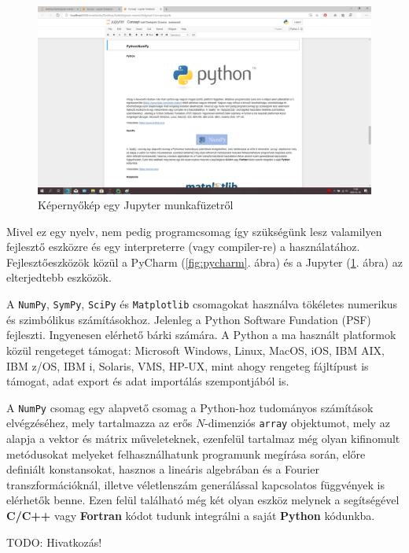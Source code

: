 \begin{figure}
\centering
\includegraphics[width=\textwidth]{img/Jupyter_screenshot.png}
\caption{Képernyőkép egy Jupyter munkafüzetről}
\label{fig:jupyter}
\end{figure}

Mivel ez egy nyelv, nem pedig programcsomag így
szükségünk lesz valamilyen fejlesztő eszközre és egy interpreterre (vagy
compiler-re) a használatához.
Fejlesztőeszközök közül a PyCharm (\ref{fig:pycharm}. ábra) és a Jupyter (\ref{fig:jupyter}. ábra) az elterjedtebb eszközök.

A \texttt{NumPy}, \texttt{SymPy},
\texttt{SciPy} és \texttt{Matplotlib} csomagokat használva tökéletes
numerikus és szimbólikus számításokhoz. Jelenleg a Python Software
Fundation (PSF) fejleszti. Ingyenesen elérhető bárki számára. A Python a
ma használt platformok közül rengeteget támogat: Microsoft Windows,
Linux, MacOS, iOS, IBM AIX, IBM z/OS, IBM i, Solaris, VMS, HP-UX, mint
ahogy rengeteg fájltípust is támogat, adat export és adat importálás
szempontjából is.

A \texttt{NumPy} csomag egy alapvető csomag a Python-hoz tudományos
számítások elvégzéséhez, mely tartalmazza az erős $N$-dimenziós
\texttt{array} objektumot, mely az alapja a vektor és mátrix
műveleteknek, ezenfelül tartalmaz még olyan kifinomult metódusokat
melyeket felhasználhatunk programunk megírása során, előre definiált
konstansokat, hasznos a lineáris algebrában és a Fourier
transzformációknál, illetve véletlenszám generálással kapcsolatos
függvények is elérhetők benne. Ezen felül található még két olyan eszköz
melynek a segítségével \textbf{C/C++} vagy \textbf{Fortran} kódot tudunk
integrálni a saját \textbf{Python} kódunkba.

TODO: Hivatkozás! %

